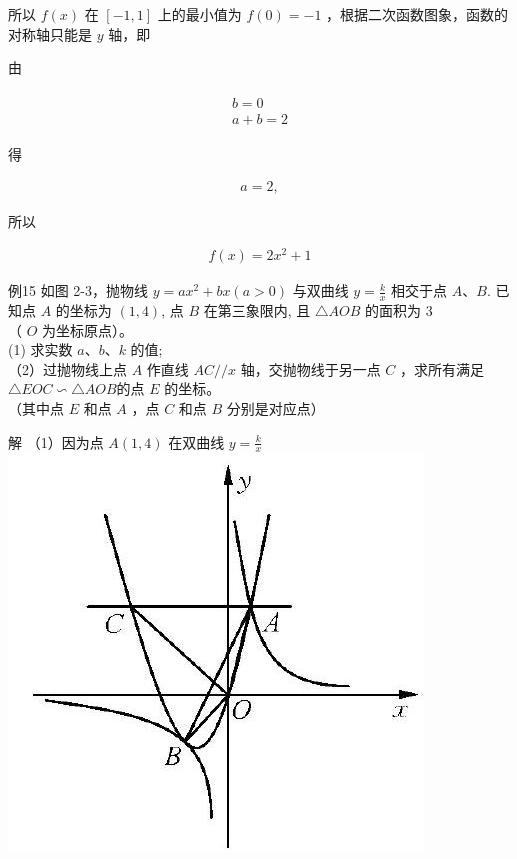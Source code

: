\documentclass[10pt]{article}
\begin{document}
所以 $f(x)$ 在 $[-1,1]$ 上的最小值为 $f(0)=-1$ ，根据二次函数图象，函数的对称轴只能是 $y$ 轴，即

由

\begin{align*}
\begin{gathered}
b=0 \\
a+b=2
\end{gathered}
\end{align*}

得

\begin{align*}
a=2,
\end{align*}

所以

\begin{align*}
f(x)=2 x^{2}+1
\end{align*}

例15 如图 2-3，抛物线 $y=a x^{2}+b x(a>0)$ 与双曲线 $y=\frac{k}{x}$ 相交于点 $A 、 B$. 已知点 $A$ 的坐标为 $(1,4)$, 点 $B$ 在第三象限内, 且 $\triangle A O B$ 的面积为 3\\
（ $O$ 为坐标原点）。\\
(1) 求实数 $a 、 b 、 k$ 的值;\\
（2）过抛物线上点 $A$ 作直线 $A C / / x$ 轴，交抛物线于另一点 $C$ ，求所有满足 $\triangle E O C \backsim \triangle A O B$的点 $E$ 的坐标。\\
（其中点 $E$ 和点 $A$ ，点 $C$ 和点 $B$ 分别是对应点）

解 （1）因为点 $A(1,4)$ 在双曲线 $y=\frac{k}{x}$\\
\includegraphics[max width=\textwidth, center]{2024_10_30_1bf34f7aeb61f11d11d3g-039(1)}
\end{document}
